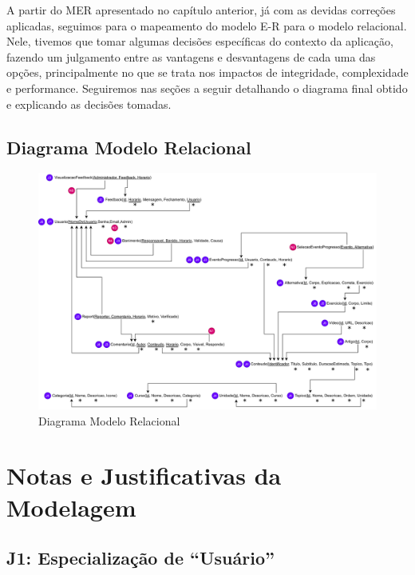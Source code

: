 A partir do MER apresentado no capítulo anterior, já com as devidas correções
aplicadas, seguimos para o mapeamento do modelo E-R para o modelo relacional.
Nele, tivemos que tomar algumas decisões específicas do contexto da aplicação,
fazendo um julgamento entre as vantagens e desvantagens de cada uma das opções,
principalmente no que se trata nos impactos de integridade, complexidade e
performance. Seguiremos nas seções a seguir detalhando o diagrama final obtido
e explicando as decisões tomadas.

\begin{landscape}
  \section{Diagrama Modelo Relacional}

  \begin{figure}[h]
    \includegraphics[height=0.76\textheight, center]{img/relacional.png}
    \caption{Diagrama Modelo Relacional}
    \label{fig:relacional}
  \end{figure}
\end{landscape}

\section{Notas e Justificativas da Modelagem}

\subsection{\textbf{J1:} Especialização de ``Usuário''}

